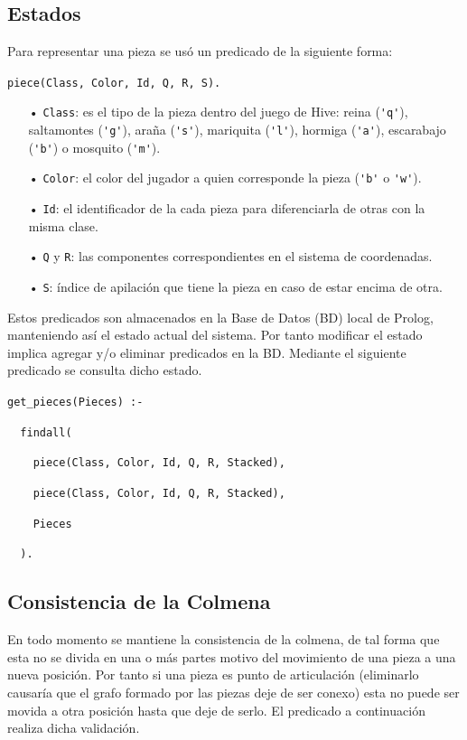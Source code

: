 \documentclass[a4paper,11pt]{article}
\begin{document}
\subsection{Estados}

Para representar una pieza se usó un predicado de la siguiente forma:

\verb+piece(Class, Color, Id, Q, R, S).+

\begin{itemize}
\item[•] \verb+Class+: es el tipo de la pieza dentro del juego de Hive: reina (\verb+'q'+), saltamontes (\verb+'g'+), araña (\verb+'s'+), mariquita (\verb+'l'+), hormiga (\verb+'a'+), escarabajo (\verb+'b'+) o mosquito (\verb+'m'+).

\item[•] \verb+Color+: el color del jugador a quien corresponde la pieza (\verb+'b'+ o \verb+'w'+).

\item[•] \verb+Id+: el identificador de la cada pieza para diferenciarla de otras con la misma clase.

\item[•] \verb+Q+ y \verb+R+: las componentes correspondientes en el sistema de coordenadas.

\item[•] \verb+S+: \'indice de apilaci\'on que tiene la pieza en caso de estar encima de otra.
\end{itemize}

Estos predicados son almacenados en la Base de Datos (BD) local de Prolog, manteniendo así el estado actual del sistema. Por tanto modificar el estado implica agregar y/o eliminar predicados en la BD. Mediante el siguiente predicado se consulta dicho estado.

\verb+get_pieces(Pieces) :-+

\verb+  findall(+

\verb+    piece(Class, Color, Id, Q, R, Stacked),+

\verb+    piece(Class, Color, Id, Q, R, Stacked),+

\verb+    Pieces+

\verb+  ).+

\subsection{Consistencia de la Colmena}

En todo momento se mantiene la consistencia de la colmena, de tal forma que esta no se divida en una o más partes motivo del movimiento de una pieza a una nueva posición. Por tanto si una pieza es punto de articulación (eliminarlo causaría que el grafo formado por las piezas deje de ser conexo) esta no puede ser movida a otra posición hasta que deje de serlo. El predicado a continuación realiza dicha validación.
\end{document}
